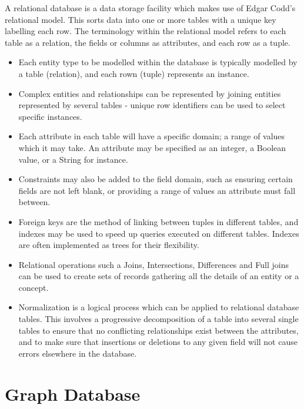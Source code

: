 \documentclass[12pt]{report}
\begin{document}
A relational database is a data storage facility which makes use of Edgar Codd's relational model. This sorts data into one or more tables with a unique key labelling each row. The terminology within the relational model refers to each table as a relation, the fields or columns as attributes, and each row as a tuple.

\begin{itemize}
	\item Each entity type to be modelled within the database is typically modelled by a table (relation), and each rown (tuple) represents an instance.
	
	\item Complex entities and relationships can be represented by joining entities represented by several tables - unique row identifiers can be used to select specific instances.
	
	\item Each attribute in each table will have a specific domain; a range of values which it may take. An attribute may be specified as an integer, a Boolean value, or a String for instance.
	
	\item Constraints may also be added to the field domain, such as ensuring certain fields are not left blank, or providing a range of values an attribute must fall between. 
	
	\item Foreign keys are the method of linking between tuples in different tables, and indexes may be used to speed up queries executed on different tables. Indexes are often implemented as trees for their flexibility. 
	
	\item Relational operations such a Joins, Intersections, Differences and Full joins can be used to create sets of records gathering all the details of an entity or a concept. 
	
	\item Normalization is a logical process which can be applied to relational database tables. This involves a progressive decomposition of a table into several single tables to ensure that no conflicting relationships exist between the attributes, and to make sure that insertions or deletions to any given field will not cause errors elsewhere in the database.
\end{itemize}


\section*{Graph Database}
\end{document}
